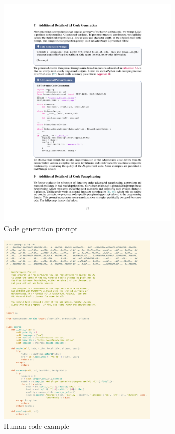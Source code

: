 \begin{figure}[H]
    \centering
    \includegraphics[width=0.8\textwidth]{img/CodeMirage/Propt_Generation.pdf}
    \caption{Code generation prompt}
    \label{fig:propt_generation}
\end{figure}


\begin{figure}[H]
    \centering
    \includegraphics[width=0.7\textwidth]{img/CodeMirage/code example.png}
    \caption{Human code example}
    \label{fig:code_example}
\end{figure}


